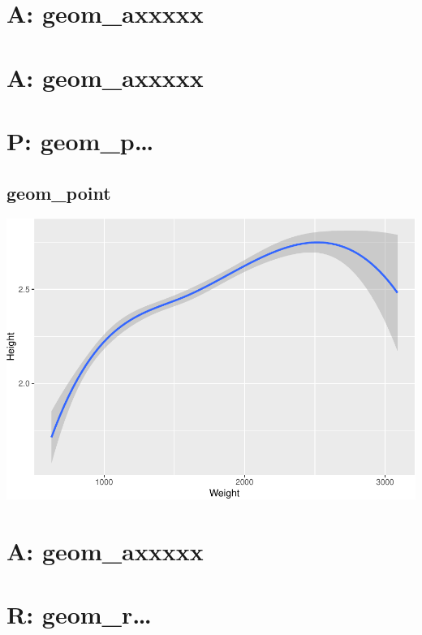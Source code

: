 \documentclass[
]{book}
\begin{document}
\hypertarget{a-geom_axxxxx-4}{%
\chapter{A: geom\_axxxxx}\label{a-geom_axxxxx-4}}

\hypertarget{a-geom_axxxxx-5}{%
\chapter{A: geom\_axxxxx}\label{a-geom_axxxxx-5}}

\hypertarget{p-geom_p}{%
\chapter{P: geom\_p\ldots{}}\label{p-geom_p}}

\hypertarget{point}{%
\section{geom\_point}\label{point}}

\includegraphics{Data-Visualisation-geom-Encyclopedia_files/figure-latex/unnamed-chunk-49-1.pdf}

\hypertarget{a-geom_axxxxx-6}{%
\chapter{A: geom\_axxxxx}\label{a-geom_axxxxx-6}}

\hypertarget{r-geom_r}{%
\chapter{R: geom\_r\ldots{}}\label{r-geom_r}}
\end{document}
